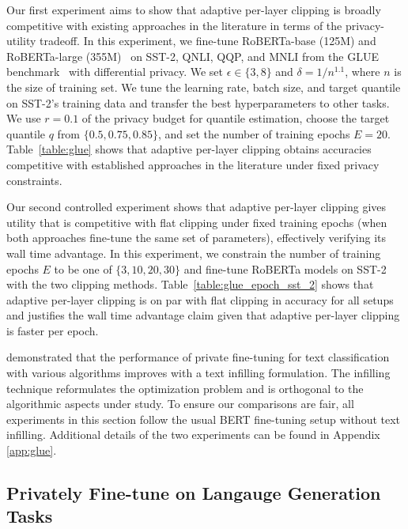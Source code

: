 Our first experiment aims to show that adaptive per-layer clipping is broadly competitive with existing approaches in the literature in terms of the privacy-utility tradeoff. 
In this experiment, we fine-tune RoBERTa-base (125M) and RoBERTa-large (355M)~\citep{liu2019roberta} on SST-2, QNLI, QQP, and MNLI from the GLUE benchmark~\citep{wang2018glue} with differential privacy. 
We set $\epsilon\in \{3,8\}$ and $\delta=1/n^{1.1}$, where $n$ is the size of training set.
We tune the learning rate, batch size, and target quantile on SST-2's training data and transfer the best hyperparameters to other tasks. 
We use $r=0.1$ of the privacy budget for quantile estimation, choose the target quantile $q$ from $\{0.5, 0.75, 0.85\}$, and set the number of training epochs $E=20$.  %
Table~\ref{table:glue} shows that adaptive per-layer clipping obtains accuracies competitive with established approaches in the literature under fixed privacy constraints.

Our second controlled experiment shows that adaptive per-layer clipping gives utility that is competitive with flat clipping under fixed training epochs (when both approaches fine-tune the same set of parameters), effectively verifying its wall time advantage. 
In this experiment, we constrain the number of training epochs $E$ to be one of $\{3, 10, 20, 30\}$ and fine-tune RoBERTa models on SST-2 with the two clipping methods.
Table~\ref{table:glue_epoch_sst_2} shows that adaptive per-layer clipping is 
on par with flat clipping in accuracy for all setups and justifies the wall time advantage claim given that adaptive per-layer clipping is faster per epoch. 

\cite{li2022large} demonstrated that the performance of private fine-tuning for text classification with various algorithms improves with a text infilling formulation. 
The infilling technique reformulates the optimization problem and is orthogonal to the algorithmic aspects under study. 
To ensure our comparisons are fair, all experiments in this section follow the usual BERT fine-tuning setup without text infilling. 
Additional details of the two experiments can be found in Appendix \ref{app:glue}.



\subsection{Privately Fine-tune on Langauge Generation Tasks} \label{subsec:gpt}



